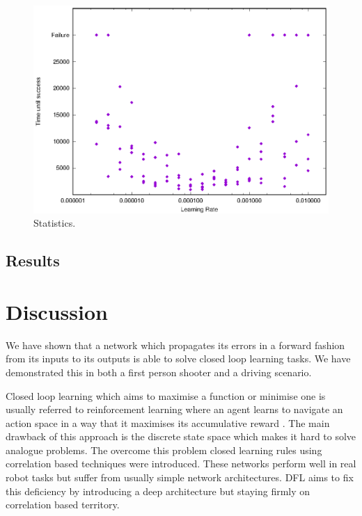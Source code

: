 \documentclass{llncs}
\begin{document}
\begin{figure}[h!]
	\centering
	\includegraphics[width=\columnwidth]{statsKD}
	\caption{Statistics.
		\label{line_stats}}
\end{figure}



\subsection{Results}


\section{Discussion}
We have shown that a network which propagates its errors in a forward
fashion from its inputs to its outputs is able to solve closed loop
learning tasks. We have demonstrated this in both a first person
shooter and a driving scenario.

Closed loop learning which aims to maximise a function or minimise one
is usually referred to reinforcement learning where an agent learns to
navigate an action space in a way that it maximises its accumulative
reward \cite{Dayan1992}. The main drawback of this approach
is the discrete state space which makes it hard to solve analogue
problems. The overcome this problem closed learning rules using
correlation based techniques \cite{Verschure98summary} were introduced.
These networks perform well in real robot tasks but suffer from
usually simple network architectures. DFL aims to fix this
deficiency by introducing a deep architecture but staying firmly
on correlation based territory.
\end{document}
